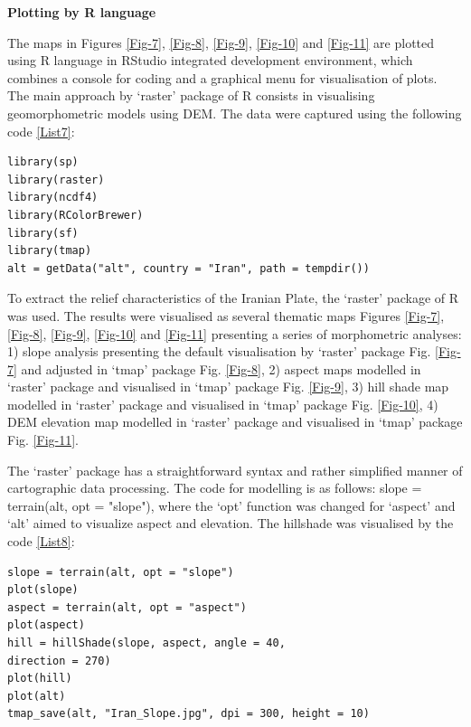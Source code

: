 \documentclass[12pt,a4paper,oneside]{article}
\def \newsubsection{\vspace{12pt}\textbf}
\begin{document}
\newsubsection{Plotting by R language}

The maps in Figures \ref{Fig-7}, \ref{Fig-8}, \ref{Fig-9}, \ref{Fig-10} and \ref{Fig-11} are plotted using R language in RStudio integrated development environment, which combines a console for coding and a graphical menu for visualisation of plots. The main approach by ‘raster’ package of R consists in visualising geomorphometric models using DEM. The data were captured using the following code \ref{List7}: 

\begin{lstlisting}[frame=single]
library(sp)
library(raster)
library(ncdf4)
library(RColorBrewer)
library(sf)
library(tmap)
alt = getData("alt", country = "Iran", path = tempdir())
\end{lstlisting}

To extract the relief characteristics of the Iranian Plate, the ‘raster’ package of R was used. The results were visualised as several thematic maps Figures \ref{Fig-7}, \ref{Fig-8}, \ref{Fig-9}, \ref{Fig-10} and \ref{Fig-11} presenting a series of morphometric analyses: 1) slope analysis presenting the default visualisation by ‘raster’ package Fig. \ref{Fig-7} and adjusted in ‘tmap’ package Fig. \ref{Fig-8}, 2) aspect maps modelled in ‘raster’ package and visualised in ‘tmap’ package Fig. \ref{Fig-9}, 3) hill shade map modelled in ‘raster’ package and visualised in ‘tmap’ package Fig. \ref{Fig-10}, 4) DEM elevation map modelled in ‘raster’ package and visualised in ‘tmap’ package Fig. \ref{Fig-11}.

The ‘raster’ package has a straightforward syntax and rather simplified manner of cartographic data processing. The code for modelling is as follows: slope = terrain(alt, opt = "slope"), where the ‘opt’ function was changed for ‘aspect’ and ‘alt’ aimed to visualize aspect and elevation. The hillshade was visualised by the code \ref{List8}:

\begin{lstlisting}[frame=single]
slope = terrain(alt, opt = "slope")
plot(slope)
aspect = terrain(alt, opt = "aspect")
plot(aspect)
hill = hillShade(slope, aspect, angle = 40, 
direction = 270)
plot(hill)
plot(alt)
tmap_save(alt, "Iran_Slope.jpg", dpi = 300, height = 10)
\end{lstlisting}
\end{document}
